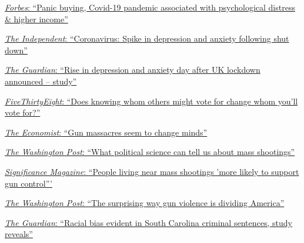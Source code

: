 \documentclass[12pt]{article}
\renewcommand{\section}[1]{\pagebreak[3]%
    \vspace{1.3\baselineskip}%
    \phantomsection\addcontentsline{toc}{section}{#1}%
    \noindent\llap{\scshape\smash{\parbox[t]{\marginparwidth}{\hyphenpenalty=10000\raggedright #1}}}%
    \vspace{-\baselineskip}\par}
\begin{document}
  
\section{Selected\\Media\\Coverage}
\begingroup

\fontsize{10}{12}\selectfont
\href{https://www.forbes.com/sites/anuradhavaranasi/2021/01/30/panic-buying-during-the-covid-19-pandemic-associated-with-psychological-distress--higher-income-study/?sh=b9cfb7f267a8}{\textit{Forbes}: ``Panic buying, Covid-19 pandemic associated with psychological distress \& higher income''}

\href{https://www.independent.co.uk/life-style/health-and-families/health-news/coronavirus-shutdown-anxiety-depression-spike-study-nhs-doctors-nurses-a9437091.html}{\textit{The Independent}: ``Coronavirus: Spike in depression and anxiety following shut down''}

\href{https://www.theguardian.com/world/2020/mar/31/rise-in-depression-and-anxiety-day-after-uk-lockdown-announced-study-coronavirus}{\textit{The Guardian}: ``Rise in depression and anxiety day after UK lockdown announced – study''}

\href{https://fivethirtyeight.com/features/does-knowing-whom-others-might-vote-for-change-whom-youll-vote-for/}{ \textit{FiveThirtyEight}: ``Does knowing whom others might vote for change whom you'll vote for?''}

\href{https://www.economist.com/united-states/2018/05/26/gun-massacres-seem-to-change-minds}
{ \textit{The Economist}: ``Gun massacres seem to change minds''}

\href{https://www.washingtonpost.com/news/monkey-cage/wp/2017/11/06/what-political-science-can-tell-us-about-mass-shootings/?utm_term=.e8b7d21f0831}
{\textit{The Washington Post}: ``What political science can tell us about mass shootings'' }

\href{https://www.significancemagazine.com/politics/572-gun-laws-and-mass-shootings}
{\textit{Significance Magazine}: ``People living near mass shootings 'more likely to support gun control''' }

\href{https://www.washingtonpost.com/news/wonk/wp/2018/05/31/the-surprising-way-gun-violence-is-dividing-america/?utm_term=.34704aeef51c}
{\textit{The Washington Post}: ``The surprising way gun violence is dividing America''}

\href{https://www.theguardian.com/us-news/2016/feb/29/racial-bias-criminal-sentencing-south-carolina}
{ \textit{The Guardian}: ``Racial bias evident in South Carolina criminal sentences, study reveals''}
\end{document}
